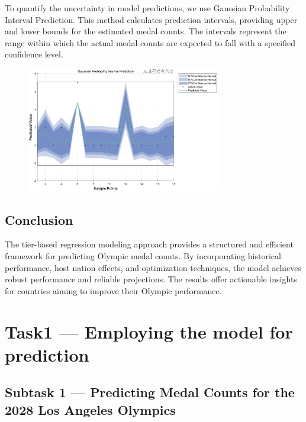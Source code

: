 \documentclass{mcmthesis}
\begin{document}
To quantify the uncertainty in model predictions, we use Gaussian Probability Interval Prediction. This method calculates prediction intervals, providing upper and lower bounds for the estimated medal counts. The intervals represent the range within which the actual medal counts are expected to fall with a specified confidence level.
\begin{figure}[htbp]
    \centering
    \includegraphics[width=3.33in, keepaspectratio]{pics/Gaussian Probability Interval Prediction.eps}  
\end{figure}

\subsection{Conclusion}

The tier-based regression modeling approach provides a structured and efficient framework for predicting Olympic medal counts. By incorporating historical performance, host nation effects, and optimization techniques, the model achieves robust performance and reliable projections. The results offer actionable insights for countries aiming to improve their Olympic performance.

\section{Task1 --- Employing the model for prediction}

\subsection{Subtask 1 --- Predicting Medal Counts for the 2028 Los Angeles Olympics}
\end{document}
